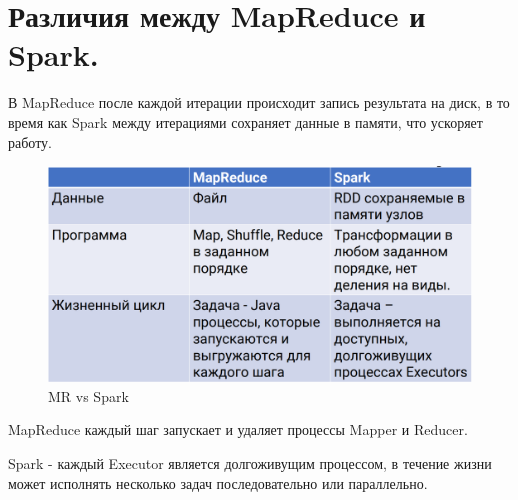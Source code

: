 \section{Различия между MapReduce и Spark.}

В MapReduce после каждой итерации происходит запись
результата на диск, в то время как Spark между итерациями
сохраняет данные в памяти, что ускоряет работу.

\begin{figure}[h]
	\centering
	\begin{minipage}[b]{0.8\textwidth}
		\includegraphics[width=\textwidth]{images/mrvspark.png}
		\caption{MR vs Spark}
	\end{minipage}
\end{figure}

MapReduce каждый шаг запускает и удаляет процессы Mapper
и Reducer.

Spark - каждый Executor является долгоживущим процессом,
в течение жизни может исполнять несколько задач последовательно
или параллельно.